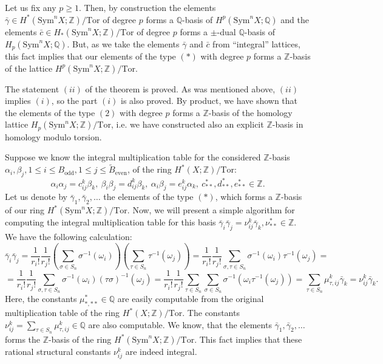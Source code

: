 \documentclass[a4paper,14pt]{article}
\newcommand{\Sym}{\mathrm{Sym}}
\newcommand{\Tor}{\mathrm{Tor}}
\newcommand{\Q}{\mathbb{Q}}
\newcommand{\Z}{\mathbb{Z}}
\begin{document}
Let us fix any $p\ge 1$. Then, by construction the elements $\bar{\gamma} \in H^*(\Sym^n X;\Z)/\Tor$ of degree $p$ forms a $\Q$-basis of $H^p(\Sym^n X;\Q)$ and the elements $\bar{c}\in H_*(\Sym^n X;\Z)/\Tor$ of degree $p$ forms a $\pm$-dual $\Q$-basis of $H_p(\Sym^n X;\Q)$. But, as we take the elements $\bar{\gamma}$ and $\bar{c}$ from ``integral'' lattices, this fact implies that our elements of the type $(*)$ with degree $p$ forms a $\Z$-basis of the lattice $H^p(\Sym^nX;\Z)/\Tor$. 

The statement $(ii)$ of the theorem is proved. As was mentioned above, $(ii)$ implies $(i)$, so the part $(i)$ is also proved. By product, we have shown that the elements of the type $(2)$ with degree $p$ forms a $\Z$-basis of the homology lattice $H_p(\Sym^nX;\Z)/\Tor$, i.e. we have constructed also an explicit $\Z$-basis in homology modulo torsion.

Suppose we know the integral multiplication table for the considered $\Z$-basis $\alpha_i,\beta_j,1\le i\le B_{\mathrm{odd}}, 1\le j \le \tilde{B}_{\mathrm{even}}$, of the ring $H^*(X;\Z)/\Tor$:
$$
\alpha_i\alpha_j = c^{k}_{ij}\beta_k,  \ \beta_i\beta_j = d^{k}_{ij}\beta_k,  \ \alpha_i\beta_j = e^{k}_{ij}\alpha_k,  \   c^*_{**}, d^*_{**}, e^*_{**}\in \Z. 
$$
Let us denote by $\bar{\gamma}_1,\bar{\gamma}_2,\ldots$ the elements of the type $(*)$, which forms a $\Z$-basis of our ring $H^*(\Sym^nX;\Z)/\Tor$. Now, we will present a simple algorithm for computing the integral multiplication table for this basis $\bar{\gamma}_i \bar{\gamma}_j = \nu^k_{ij} \bar{\gamma}_k, \nu^*_{**}\in \Z$. We have the following calculation:
$$
\bar{\gamma}_i \bar{\gamma}_j = \frac{1}{r_i!}\frac{1}{r_j!}\left(\sum_{\sigma\in S_n} \sigma^{-1}(\omega_i)\right)\left(\sum_{\tau\in S_n} \tau^{-1}(\omega_j)\right) = \frac{1}{r_i!}\frac{1}{r_j!}\sum_{\sigma,\tau \in S_n} \sigma^{-1}(\omega_i)\tau^{-1}(\omega_j) =
$$
$$
=  \frac{1}{r_i!}\frac{1}{r_j!}\sum_{\sigma,\tau \in S_n} \sigma^{-1}(\omega_i) (\tau\sigma)^{-1}(\omega_j) =  \frac{1}{r_i!}\frac{1}{r_j!}\sum_{\tau \in S_n}\sum_{\sigma \in S_n}\sigma^{-1}(\omega_i\tau^{-1}(\omega_j))   =   \sum_{\tau \in S_n} \mu^k_{\tau,ij}\bar{\gamma}_k  =  \nu^k_{ij}\bar{\gamma}_k.
$$
Here, the constants $\mu^*_{*,**}\in \Q$ are easily computable from the original multiplication table of the ring $H^*(X;\Z)/\Tor$. The constants $\nu^k_{ij}= \sum_{\tau\in S_n}\mu^k_{\tau,ij} \in \Q$ are also computable. We know, that the elements $\bar{\gamma}_1,\bar{\gamma}_2,\ldots$ forms the $\Z$-basis of the ring $H^*(\Sym^nX;\Z)/\Tor$. This fact  implies that these rational structural constants $\nu^{k}_{ij}$ are indeed integral. 
\end{document}
